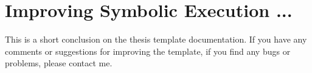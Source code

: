 \chapter{Improving Symbolic Execution ...}

This is a short conclusion on the thesis template documentation. If you have any comments or suggestions for improving the template, if you find any bugs or problems, please contact me. 

